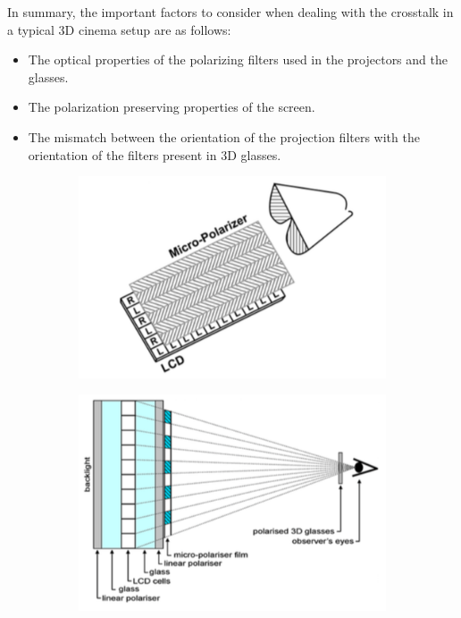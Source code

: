 In summary, the important factors to consider when dealing with the crosstalk in a typical 3D cinema setup are as follows:
\begin{itemize}
\item{The optical properties of the polarizing filters used in the projectors and the glasses.}
\item{The polarization preserving properties of the screen. }
\item{The mismatch between the orientation of the projection filters with the orientation of the filters present in 3D glasses.}
\end{itemize}

\begin{figure}[htbp]
\centering
     \begin{subfigure}[b]{0.6\textwidth}
        \includegraphics[width=\textwidth]{./Template_Figures/polarized_lcd}
        \caption{ }\label{fig:polarized_lcd}
    \end{subfigure}
    \begin{subfigure}[b]{0.6\textwidth}
        \includegraphics[width=\textwidth]{./Template_Figures/polarized_lcd_problem}
        \caption{ }\label{fig:polarized_lcd_prob}
    \end{subfigure}


\end{figure}
